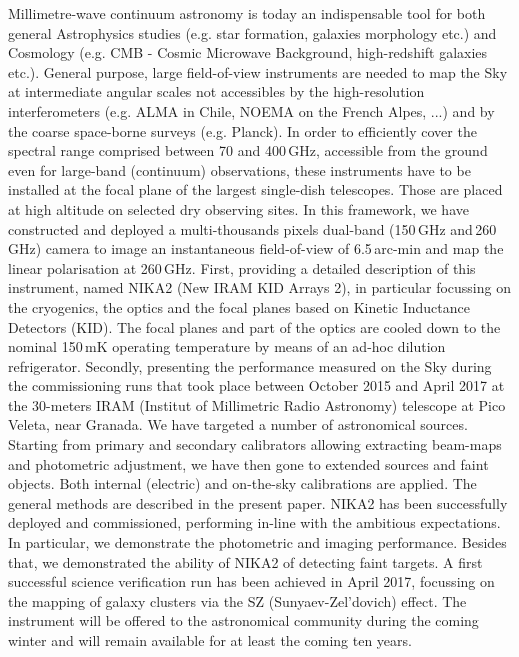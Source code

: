 \documentclass[]{aa} %
\begin{document}
  \abstract
   {Millimetre-wave continuum astronomy is today an indispensable tool for both general Astrophysics studies (e.g. star formation, galaxies morphology etc.) and Cosmology (e.g. CMB - Cosmic Microwave Background, high-redshift galaxies etc.). General purpose, large field-of-view instruments are needed to map the Sky at intermediate angular scales not accessibles by the high-resolution interferometers (e.g. ALMA in Chile, NOEMA on the French Alpes, ...) and by the coarse space-borne surveys (e.g. Planck). In order to efficiently cover the spectral range comprised between 70 and 400\,GHz, accessible from the ground even for large-band (continuum) observations, these instruments have to be installed at the focal plane of the largest single-dish telescopes. Those are placed at high altitude on selected dry observing sites. In this framework, we have constructed and deployed a multi-thousands pixels dual-band (150\,GHz and\,260 GHz) camera to image an instantaneous field-of-view of 6.5\,arc-min and map the linear polarisation at 260\,GHz.}
   {First, providing a detailed description of this instrument, named NIKA2 (New IRAM KID Arrays 2), in particular focussing on the cryogenics, the optics  and the focal planes based on Kinetic Inductance Detectors (KID). The focal planes and part of the optics are cooled down to the nominal 150\,mK operating temperature by means of an ad-hoc dilution refrigerator. 
Secondly, presenting the performance measured on the Sky during the commissioning runs that took place between October 2015 and April 2017 at the 30-meters IRAM (Institut of Millimetric Radio Astronomy) telescope at Pico Veleta, near Granada.}
   {We have targeted a number of astronomical sources. Starting from primary and secondary calibrators allowing extracting beam-maps and photometric adjustment, we have then gone to extended sources and faint objects. Both internal (electric) and on-the-sky calibrations are applied. The general methods are described in the present paper.}
   {NIKA2 has been successfully deployed and commissioned, performing in-line with the ambitious expectations. In particular, we demonstrate the photometric and imaging performance. Besides that, we demonstrated the ability of NIKA2 of detecting faint targets. A first successful science verification run has been achieved in April 2017, focussing on the mapping of galaxy clusters via the SZ (Sunyaev-Zel\textquoteright dovich) effect. The instrument will be offered to the astronomical community during the coming winter and will remain available for at least the coming ten years.}
 
\end{document}
